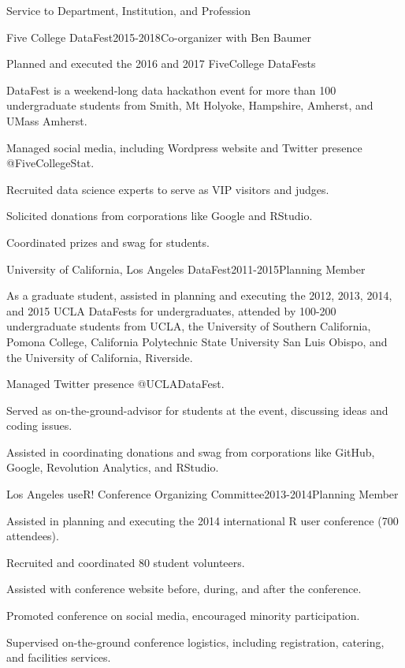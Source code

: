 \documentclass{resume} %
\begin{document}
\begin{rSection}{Service to Department, Institution, and Profession}
\begin{rSubsection}{Five College DataFest}{}{2015-2018}{Co-organizer with Ben Baumer }
\item Planned and executed the 2016 and 2017 FiveCollege DataFests
\item DataFest is a weekend-long data hackathon event for more than 100 undergraduate students from Smith, Mt Holyoke, Hampshire, Amherst, and UMass Amherst. 
\item Managed social media, including Wordpress website and Twitter presence @FiveCollegeStat. 
\item Recruited data science experts to serve as VIP visitors and judges. 
\item Solicited donations from corporations like Google and RStudio. 
\item Coordinated prizes and swag for students. 
\end{rSubsection}


\begin{rSubsection}{University of California, Los Angeles DataFest}{}{2011-2015}{Planning Member}
\item As a graduate student, assisted in planning and executing the 2012, 2013, 2014, and 2015 UCLA DataFests for undergraduates, attended by 100-200 undergraduate students from UCLA, the University of Southern California, Pomona College, California Polytechnic State University San Luis Obispo, and the University of California, Riverside. 
\item Managed Twitter presence @UCLADataFest. 
\item Served as on-the-ground-advisor for students at the event, discussing ideas and coding issues. 
\item Assisted in coordinating donations and swag from corporations like GitHub, Google, Revolution Analytics, and RStudio. 
\end{rSubsection}

\begin{rSubsection}{Los Angeles useR! Conference Organizing Committee}{}{2013-2014}{Planning Member}
\item Assisted in planning and executing the 2014 international R user conference (700 attendees).
\item Recruited and coordinated 80 student volunteers.
\item Assisted with conference website before, during, and after the conference.
\item Promoted conference on social media, encouraged minority participation.
\item Supervised on-the-ground conference logistics, including registration, catering, and facilities services. 
\end{rSubsection}


\end{rSection}
\end{document}
